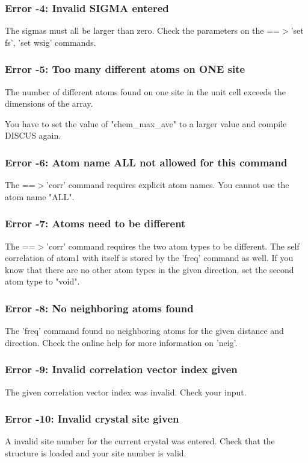 \subsubsection{Error -4: Invalid SIGMA entered}
\par
The sigmas must all be larger than zero. 
Check the parameters on the ==$> $'set fs', 'set wsig' commands. 
\subsubsection{Error -5: Too many different atoms on ONE site}
\par
The number of different atoms found on one site in the unit cell 
exceeds the dimensions of the array. 
\par
You have to set the value of "chem\_max\_ave" to a larger value and 
compile DISCUS again. 
\subsubsection{Error -6: Atom name ALL not allowed for this command}
\par
The ==$> $'corr' command requires explicit atom names. You cannot use 
the atom name "ALL". 
\subsubsection{Error -7: Atoms need to be different}
\par
The ==$> $'corr' command requires the two atom types to be different. 
The self correlation of atom1 with itself is stored by the 'freq' 
command as well. 
If you know that there are no other atom types in the given direction, 
set the second atom type to "void". 
\subsubsection{Error -8: No neighboring atoms found}
\par
The 'freq' command found no neighboring atoms for the given distance 
and direction. Check the online help for more information on 'neig'. 
\subsubsection{Error -9: Invalid correlation vector index given}
\par
The given correlation vector index was invalid. Check your input. 
\subsubsection{Error -10: Invalid crystal site given}
\par
A invalid site number for the current crystal was entered. Check that 
the structure is loaded and your site number is valid. 
